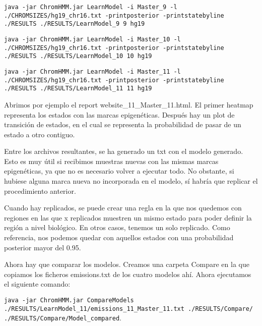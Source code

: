 \texttt{java -jar ChromHMM.jar LearnModel -i Master\_9 -l ./CHROMSIZES/hg19\_chr16.txt -printposterior -printstatebyline ./RESULTS ./RESULTS/LearnModel\_9 9 hg19}

\texttt{java -jar ChromHMM.jar LearnModel -i Master\_10 -l ./CHROMSIZES/hg19\_chr16.txt -printposterior -printstatebyline ./RESULTS ./RESULTS/LearnModel\_10 10 hg19}

\texttt{java -jar ChromHMM.jar LearnModel -i Master\_11 -l ./CHROMSIZES/hg19\_chr16.txt -printposterior -printstatebyline ./RESULTS ./RESULTS/LearnModel\_11 11 hg19}

Abrimos por ejemplo el report website\_11\_Master\_11.html. El primer heatmap representa los estados con las marcas epigenéticas. Después hay un plot de transición de estados, en el cual se representa la probabilidad de pasar de un estado a otro contiguo. 

Entre los archivos resultantes, se ha generado un txt con el modelo generado. Esto es muy útil si recibimos muestras nuevas con las mismas marcas epigenéticas, ya que no es necesario volver a ejecutar todo. No obstante, si hubiese alguna marca nueva no incorporada en el modelo, sí habría que replicar el procedimiento anterior.

Cuando hay replicados, se puede crear una regla en la que nos quedemos con regiones en las que x replicados muestren un mismo estado para poder definir la región a nivel biológico. En otros casos, tenemos un solo replicado. Como referencia, nos podemos quedar con aquellos estados con una probabilidad posterior mayor del 0.95. 

Ahora hay que comparar los modelos. Creamos una carpeta Compare en la que copiamos los ficheros emissions.txt de los cuatro modelos ahí. Ahora ejecutamos el siguiente comando:

\texttt{java -jar ChromHMM.jar CompareModels ./RESULTS/LearnModel\_11/emissions\_11\_Master\_11.txt
./RESULTS/Compare/
./RESULTS/Compare/Model\_compared}.




